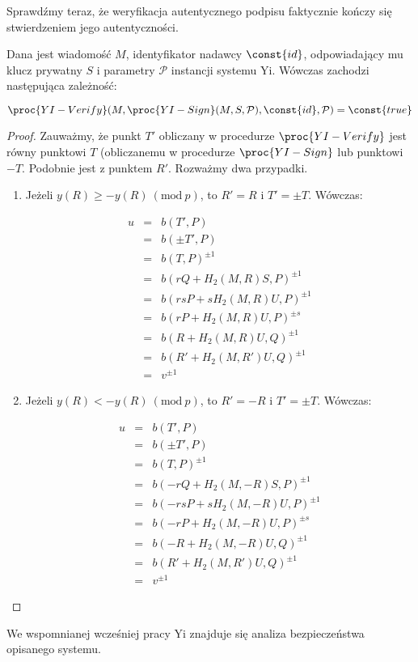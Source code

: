 \noindent
Sprawdźmy teraz, że weryfikacja autentycznego podpisu
faktycznie kończy się stwierdzeniem jego autentyczności.

\begin{theorem}
Dana jest wiadomość $M$, identyfikator nadawcy $\const{id}$,
odpowiadający mu klucz prywatny $S$
i parametry $\mathcal{P}$ instancji systemu Yi.
Wówczas zachodzi następująca zależność:

\begin{equation*}
\proc{YI-Verify}(
    M,
    \proc{YI-Sign}(
        M,
        S,
        \mathcal{P}
    ),
    \const{id},
    \mathcal{P}
) = \const{true}
\end{equation*}
\end{theorem}

\begin{proof}
Zauważmy, że punkt $T'$ obliczany w procedurze $\proc{YI-Verify}$
jest równy punktowi $T$ (obliczanemu w procedurze $\proc{YI-Sign}$
lub punktowi $-T$.
Podobnie jest z punktem $R'$.
Rozważmy dwa przypadki.

\begin{enumerate}
\item
Jeżeli $y(R) \geq -y(R)\ (\text{mod}\ p)$, to $R' = R$ i $T' = \pm T$.
Wówczas:

\begin{eqnarray*}
u
& = & b(T', P)
\\
& = & b(\pm T', P)
\\
& = & b(T, P)^{\pm 1}
\\
& = & b(rQ + H_2(M, R)S, P)^{\pm 1}
\\
& = & b(rsP + sH_2(M, R)U, P)^{\pm 1}
\\
& = & b(rP + H_2(M, R)U, P)^{\pm s}
\\
& = & b(R + H_2(M, R)U, Q)^{\pm 1}
\\
& = & b(R' + H_2(M, R')U, Q)^{\pm 1}
\\
& = & v^{\pm 1}
\end{eqnarray*}

\item
Jeżeli $y(R) < -y(R)\ (\text{mod}\ p)$, to $R' = -R$ i $T' = \pm T$.
Wówczas:

\begin{eqnarray*}
u
& = & b(T', P)
\\
& = & b(\pm T', P)
\\
& = & b(T, P)^{\pm 1}
\\
& = & b(-rQ + H_2(M, -R)S, P)^{\pm 1}
\\
& = & b(-rsP + sH_2(M, -R)U, P)^{\pm 1}
\\
& = & b(-rP + H_2(M, -R)U, P)^{\pm s}
\\
& = & b(-R + H_2(M, -R)U, Q)^{\pm 1}
\\
& = & b(R' + H_2(M, R')U, Q)^{\pm 1}
\\
& = & v^{\pm 1}
\end{eqnarray*}
\end{enumerate}
\end{proof}

\noindent
We wspomnianej wcześniej pracy Yi znajduje się analiza bezpieczeństwa
opisanego systemu.
